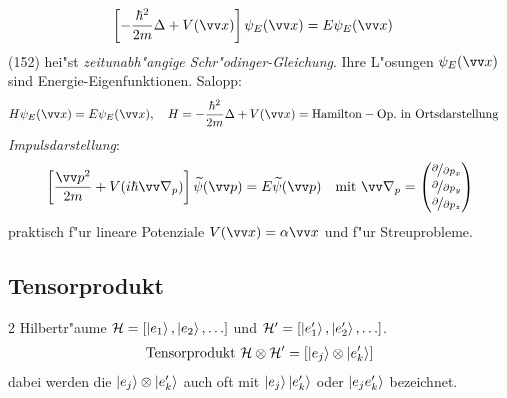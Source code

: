 \documentclass[a4paper]{scrartcl}
\begin{document}
{\begin{align}
\left[ -\frac{\hbar^2}{2m} \Delta + V(\vv x) \right] \psi_E(\vv x) & = E \psi_E(\vv x)
\end{align}
(152) hei"st \emph{zeitunabh"angige Schr"odinger-Gleichung}. Ihre L"osungen $\psi_E(\vv x)$ sind Energie-Eigenfunktionen. Salopp:
\begin{align}
H \psi_E(\vv x) & = E \psi_E(\vv x), \quad H = - \frac{\hbar^2}{2m} \Delta + V(\vv x) = \mathrm{Hamilton-Op. \ in \ Ortsdarstellung}
\end{align}
\emph{Impulsdarstellung}:
\begin{align}
\left[ \frac{\vv p^2}{2m} + V(i\hbar \vv \nabla_p) \right] \widetilde \psi (\vv p) = E \widetilde \psi(\vv p) \quad \mathrm{mit \ } \vv \nabla_p = \matr{ \nicefrac \partial {\partial p_x} \\ \nicefrac \partial {\partial p_y} \\ \nicefrac \partial {\partial p_z}}  
\end{align}
praktisch f"ur lineare Potenziale $V(\vv x) = \alpha \vv x$ und f"ur Streuprobleme.

\subsection{Tensorprodukt}

2 Hilbertr"aume $\mathcal H = \left[ \ket{e_1}, \ket{e_2}, \ldots \right]$ und $\mathcal H' = \left[ \ket{e_1'}, \ket{e_2'}, \ldots \right]$.
\begin{align}
\mathrm{Tensorprodukt \ } \mathcal H \otimes \mathcal H' = \left[ \ket{e_j} \otimes \ket{e_k'} \right]
\end{align}
dabei werden die $\ket{e_j} \otimes \ket{e_k'}$ auch oft mit $\ket{e_j} \ket{e_k'}$ oder $\ket{ e_j e_k'}$ bezeichnet.

}
\end{document}
